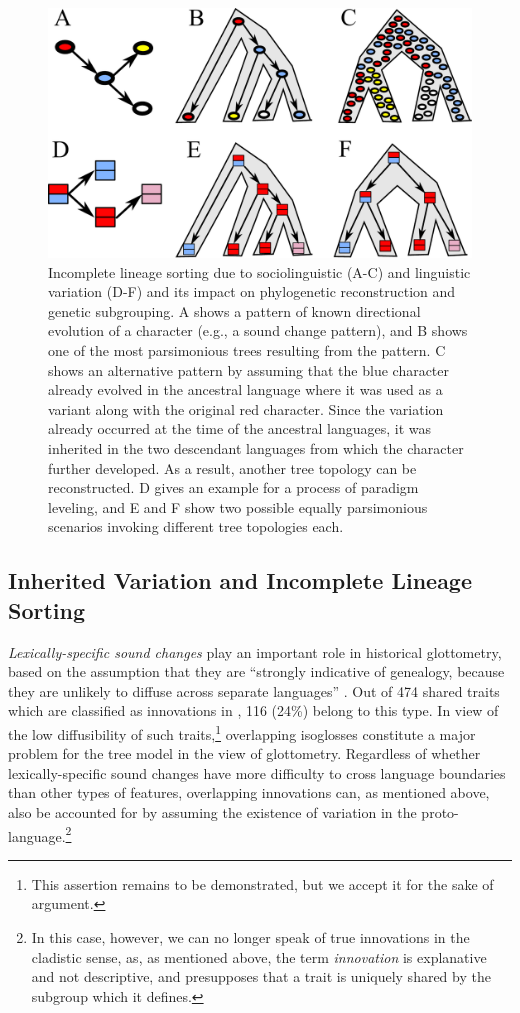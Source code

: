 \documentclass[svgnames,12pt]{scrartcl}
\begin{document}
{{\begin{figure}[htb]
  \centering
  \includegraphics[width=\textwidth]{images/ils.pdf}
  \caption{Incomplete lineage sorting due to sociolinguistic (A-C) and linguistic variation (D-F)
  and its impact   on phylogenetic reconstruction and genetic subgrouping. A shows a pattern of
  known directional   evolution of a character (e.g., a sound change pattern), and B shows one of
  the most parsimonious trees resulting from the pattern. C shows an alternative pattern by assuming
  that the blue   character already evolved in the ancestral language where it was used as a variant
  along with the original red character. Since the variation already occurred at the time of the
  ancestral languages, it was inherited in the two descendant languages from which the character
  further developed. As a result, another tree topology can be reconstructed. D gives an example for
  a process of paradigm leveling, and E and F show two possible equally parsimonious scenarios
  invoking different tree topologies each.}
  \label{fig:ils}
\end{figure}
 
\subsection{Inherited Variation and Incomplete Lineage Sorting}\label{sec:ils}
\textit{Lexically-specific sound changes} play an important role in historical glottometry, based on
the assumption that they are ``strongly indicative of genealogy, because they are unlikely to
diffuse across separate languages'' \citep[178]{Francois2014}. Out of 474 shared traits which are
classified as innovations in \citet{Francois2014}, 116 (24\%) belong to this type. In view of the
low diffusibility of such traits,\footnote{This assertion remains to be demonstrated, but we accept
it for the sake of argument.} overlapping isoglosses constitute a major problem for the tree model
in the view of glottometry. Regardless of whether lexically-specific sound changes have more
difficulty to cross language boundaries than other types of features, overlapping innovations can,
as mentioned above, also be accounted for by assuming the existence of variation in the
proto-language.\footnote{In this case, however, we can no longer speak of true innovations in the
cladistic sense, as, as mentioned above, the term \emph{innovation} is explanative and not descriptive,
and presupposes that a trait is uniquely shared by the subgroup which it defines.}

}}
\end{document}
